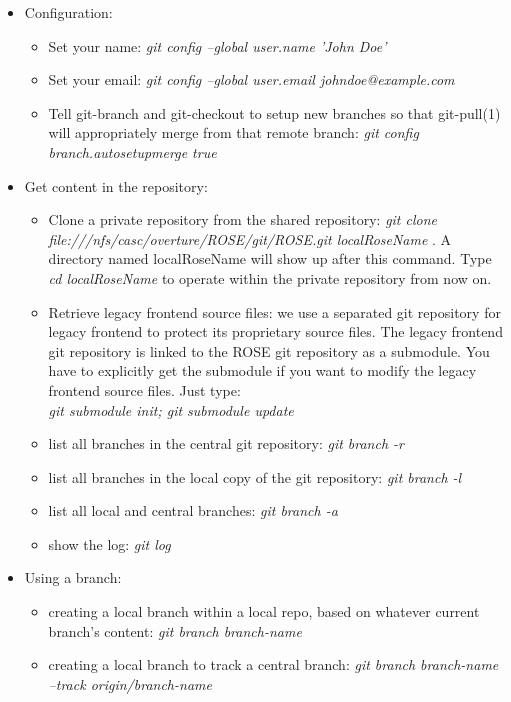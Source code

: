 \begin{itemize}

\item Configuration:
  \begin{itemize}
          \item Set your name: \textit{git config --global user.name 'John Doe' }
	  \item Set your email: \textit{git config --global user.email johndoe@example.com}
	  \item Tell git-branch and git-checkout to setup new branches so that git-pull(1)
    will appropriately merge from that remote branch: \textit{git config branch.autosetupmerge true}
   \end{itemize}       
\item Get content in the repository:
  \begin{itemize}
          \item Clone a private repository from the shared repository: \textit{git clone 
          file:///nfs/casc/overture/ROSE/git/ROSE.git localRoseName} . A
          directory named localRoseName will show up after this 
           command. Type \textit{cd localRoseName} to operate within the private repository from now on.
           \item Retrieve legacy frontend source files: we use a separated git
           repository for legacy frontend to protect its proprietary source files. The
           legacy frontend git repository is linked to the ROSE git repository as a
           submodule. You have to explicitly get the submodule if you want to
           modify the legacy frontend source files. Just type:
           \\ \textit{git submodule init; git submodule update}
          \item list all branches in the central git repository: \textit{git branch -r}
          \item list all branches in the local copy of the git repository: \textit{git branch -l}
          \item list all local and central branches: \textit{git branch -a}

          \item show the log: \textit{git log} 
   \end{itemize}       
\item Using a branch:
   \begin{itemize}
          \item creating a local branch within a local repo, based on
          whatever current branch's content: \textit{git branch branch-name} 
          \item creating a local branch to track a central branch: \textit{git branch branch-name --track origin/branch-name} 


\end{itemize}
\end{itemize}
